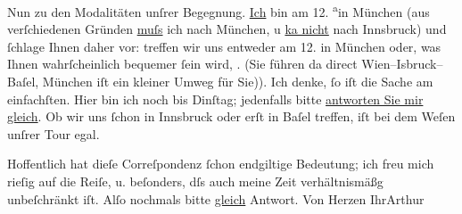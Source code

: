 \pstart
           Nun zu den Modalitäten unſrer Begegnung. \uline{Ich} bin am
                  12.{ }\substVorne{}\textsuperscript{a}\substDazwischen{}i\substHinten{}n München (aus verſchiedenen Gründen
                  \uline{muſs} ich nach München, u \uline{ka{\geminationn}
                  nicht} nach Innsbruck) und ſchlage Ihnen
               daher vor: treffen wir uns entweder am 12.{ }{\pb}in München oder,
               was Ihnen wahrſcheinlich bequemer ſein wird, . (Sie führen da{\geminationn} direct Wien–\introOben{}I{\geminationn}sbruck–\introOben{}Baſel, \label{T_L00830-1v}\label{T_L00830-1}München iſt ein kleiner Umweg für Sie)). Ich
               denke, ſo iſt die Sache am einfachſten. Hier bin ich noch bis Dinſtag;
               jedenfalls bitte \uline{antworten Sie mir gleich}. Ob wir uns
               ſchon in Innsbruck oder erſt {\pb}in Baſel treffen, iſt
               bei dem Weſen unſrer Tour egal.\pend
           
\pstart
           Hoffentlich hat dieſe Correſpondenz ſchon endgiltige Bedeutung; ich freu mich rieſig
               auf die Reiſe, u. beſonders, dſs auch meine Zeit verhältnismäßg unbeſchränkt iſt.
               Alſo nochmals bitte \uline{gleich} Antwort. Von Herzen
                  Ihr\hspace*{1.5em}\spacefill\mbox{Arthur}\pend
           
